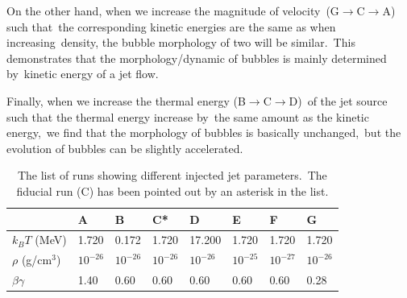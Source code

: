 \documentclass[fleqn,usenatbib,useAMS]{mnras}
\begin{document}
On the other hand, when we increase the magnitude of velocity\
(G$\rightarrow$C$\rightarrow$A) such that\
the corresponding kinetic energies are the same as when increasing\
density, the bubble morphology of two will be similar.\
This demonstrates that the morphology/dynamic of bubbles is mainly determined by\
kinetic energy of a jet flow.


Finally, when we increase the thermal energy (B$\rightarrow$C$\rightarrow$D)\
of the jet source such that the thermal energy increase by\
the same amount as the kinetic energy,\
we find that the morphology of bubbles is basically unchanged,\
but the evolution of bubbles can be slightly accelerated.


\begin{table}
\raggedright
\caption{The list of runs showing different injected jet parameters.\
         The fiducial run (C) has been pointed out by an asterisk in the list. }
\label{tablb-jet-parameters}
\begin{tabular}{@{}llllllll@{}}
\toprule[1pt]\midrule[0.3pt]
                  & A          & B          & C*         & D           & E          & F          & G          \\ \midrule
$k_{B}T$ (MeV)    & 1.720      & 0.172      & 1.720      & 17.200      & 1.720      & 1.720      & 1.720      \\
$\rho$ (g/cm$^3$) & $10^{-26}$ & $10^{-26}$ & $10^{-26}$ & $10^{-26}$  & $10^{-25}$ & $10^{-27}$ & $10^{-26}$ \\
$\beta\gamma$     & 1.40       & 0.60       & 0.60       & 0.60        & 0.60       & 0.60       & 0.28       \\ \midrule
\end{tabular}
\end{table}


\end{document}
